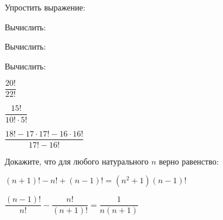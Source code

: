 \begin{listofex}
	\item Упростить выражение:
	\begin{enumcols}[itemcolumns=2]
		\item {}
		\item {}
		\item {}
	\end{enumcols}
	\item Вычислить:
	\begin{enumcols}[itemcolumns=2]
		\item {}
		\item {}
		\item {}
		\item {}
	\end{enumcols}
	\item Вычислить:
	\begin{enumcols}[itemcolumns=2]
		\item {}
		\item {}
	\end{enumcols}
	\item Вычислить:
	\begin{enumcols}[itemcolumns=3]
		\item \( \dfrac{20!}{22!} \) 
		\item \( \dfrac{15!}{10!\cdot5!} \) 
		\item \( \dfrac{18!-17\cdot17!-16\cdot16!}{17!-16!} \) 
	\end{enumcols}
	\item Докажите, что для любого натурального \( n \) верно равенство:
	\begin{enumcols}[itemcolumns=2]
		\item \( (n+1)!-n!+(n-1)! = (n^2+1)(n-1)! \)
		\item \( \dfrac{(n-1)!}{n!}-\dfrac{n!}{(n+1)!}=\dfrac{1}{n(n+1)} \)
	\end{enumcols}
	\item {}
\end{listofex}
%	
